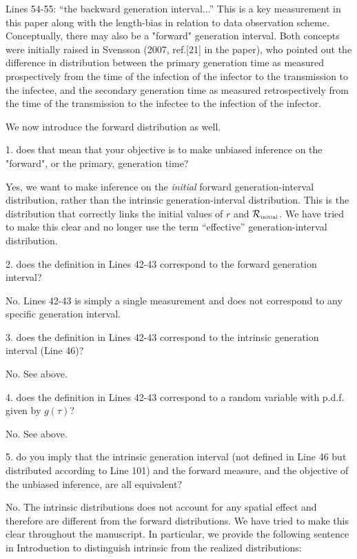 \documentclass[12pt]{article}
\newcommand{\Rx}[1]{\ensuremath{{\cal R}_{#1}}}
\newcommand{\Rini}{\Rx{\textrm{\tiny initial}}}
\newcommand{\revtext}{\textsf}
\begin{document}
\revtext{Lines 54-55: ``the backward generation interval...'' This is a key measurement in this paper along with the length-bias in relation to data observation scheme. Conceptually, there may also be a "forward" generation
interval. Both concepts were initially raised in Svensson (2007, ref.[21]
in the paper), who pointed out the difference in distribution between the
primary generation time as measured prospectively from the time of the
infection of the infector to the transmission to the infectee, and the secondary generation time as measured retrospectively from the time of the
transmission to the infectee to the infection of the infector.}

We now introduce the forward distribution as well.

\revtext{1. does that mean that your objective is to make unbiased inference on the
"forward", or the primary, generation time?}

Yes, we want to make inference on the \emph{initial} forward generation-interval distribution, rather than the intrinsic generation-interval distribution.
This is the distribution that correctly links the initial values of $r$ and \Rini.
We have tried to make this clear and no longer use the term ``effective'' generation-interval distribution.

\revtext{2. does the definition in Lines 42-43 correspond to the forward generation
interval?}

No. Lines 42-43 is simply a single measurement and does not correspond to any specific generation interval.

\revtext{3. does the definition in Lines 42-43 correspond to the intrinsic generation
interval (Line 46)?}

No. See above.

\revtext{4. does the definition in Lines 42-43 correspond to a random variable with
p.d.f. given by $g(\tau)$?}

No. See above.

\revtext{5. do you imply that the intrinsic generation interval (not defined in Line 46
but distributed according to Line 101) and the forward measure, and the
objective of the unbiased inference, are all equivalent?}

No. The intrinsic distributions does not account for any spatial effect and therefore are different from the forward distributions.
We have tried to make this clear throughout the manuscript.
In particular, we provide the following sentence in Introduction to distinguish intrinsic from the realized distributions:
\end{document}
